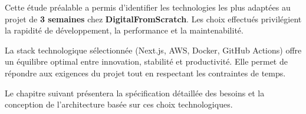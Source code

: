 Cette étude préalable a permis d'identifier les technologies les plus adaptées au projet de \textbf{\color{primaryblue}3 semaines} chez \textcolor{accentgreen}{\textbf{DigitalFromScratch}}. Les choix effectués privilégient la rapidité de développement, la performance et la maintenabilité.

\begin{warningbox}
La stack technologique sélectionnée (Next.js, AWS, Docker, GitHub Actions) offre un équilibre optimal entre innovation, stabilité et productivité. Elle permet de répondre aux exigences du projet tout en respectant les contraintes de temps.
\end{warningbox}

Le chapitre suivant présentera la spécification détaillée des besoins et la conception de l'architecture basée sur ces choix technologiques.
